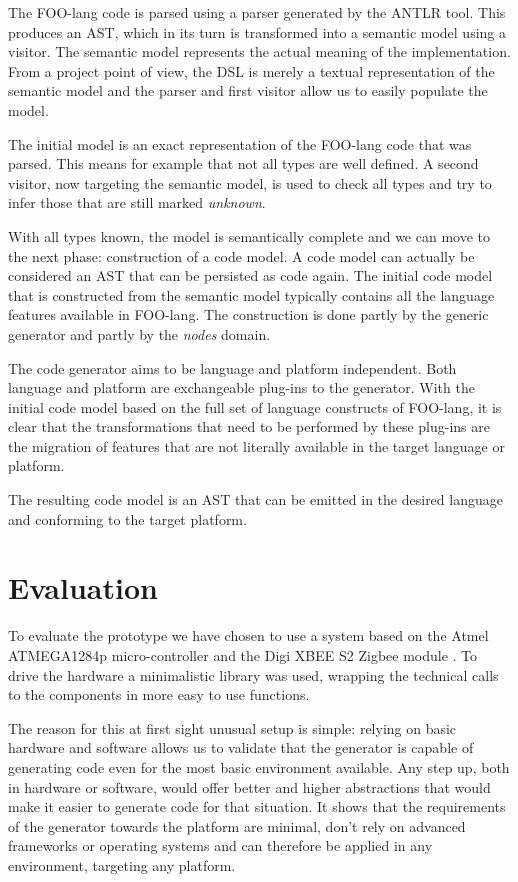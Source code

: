 \documentclass[conference]{IEEEtran}
\begin{document}
The FOO-lang code is parsed using a parser generated by the ANTLR tool. This
produces an AST, which in its turn is transformed into a semantic model using a
visitor. The semantic model represents the actual meaning of the
implementation. From a project point of view, the DSL is merely a textual
representation of the semantic model and the parser and first visitor allow us
to easily populate the model.

The initial model is an exact representation of the FOO-lang code that was
parsed. This means for example that not all types are well defined. A second
visitor, now targeting the semantic model, is used to check all types and try
to infer those that are still marked \emph{unknown}.

With all types known, the model is semantically complete and we can move to the
next phase: construction of a code model. A code model can actually be
considered an AST that can be persisted as code again. The initial code model
that is constructed from the semantic model typically contains all the language
features available in FOO-lang. The construction is done partly by the generic
generator and partly by the \emph{nodes} domain.

The code generator aims to be language and platform independent. Both language
and platform are exchangeable plug-ins to the generator. With the initial code
model based on the full set of language constructs of FOO-lang, it is clear
that the transformations that need to be performed by these plug-ins are the
migration of features that are not literally available in the target language
or platform.

The resulting code model is an AST that can be emitted in the desired language
and conforming to the target platform.

\section{Evaluation}
\label{section:evaluation}

To evaluate the prototype we have chosen to use a system based on the Atmel
ATMEGA1284p micro-controller \cite{datasheet:atmega1284p} and the Digi XBEE S2
Zigbee module \cite{datasheet:xbee}. To drive the hardware a minimalistic
library was used, wrapping the technical calls to the components in more easy
to use functions.

The reason for this at first sight unusual setup is simple: relying on basic
hardware and software allows us to validate that the generator is capable of
generating code even for the most basic environment available. Any step up,
both in hardware or software, would offer better and higher abstractions that
would make it easier to generate code for that situation. It shows that the
requirements of the generator towards the platform are minimal, don't rely on
advanced frameworks or operating systems and can therefore be applied in any
environment, targeting any platform.
\end{document}
